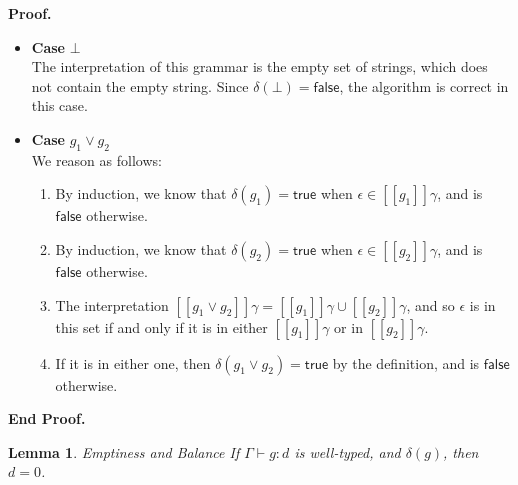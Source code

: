 \documentclass{article}
\newcommand{\judgebalance}[3][\Gamma]{{#1} \vdash {#2} : {#3}}
\newcommand{\true}{\mathsf{true}}
\newcommand{\false}{\mathsf{false}}
\newcommand{\interp}[1]{[\![{#1}]\!]}
\newcommand{\emptify}[1]{\delta({#1})}
\newtheorem{lemma}{Lemma}
\newenvironment{proof}{\noindent\textbf{Proof.}}{\noindent\textbf{End Proof.}}
\newenvironment{caseblock}{\begin{itemize}}{\end{itemize}}
\newenvironment{case}[1]{\item \textbf{Case} {#1}\\}{}
\begin{document}
\begin{proof}
\begin{caseblock}
  \begin{case}{$\bot$}
    The interpretation of this grammar is the empty set of strings, which does not
    contain the empty string. Since $\emptify{\bot} = \false$, the algorithm is correct in
    this case. 
  \end{case}

  \begin{case}{$g_1 \vee g_2$}
    We reason as follows:
    \begin{enumerate}
      \item By induction, we know that $\emptify{g_1} = \true$ when $\epsilon \in \interp{g_1}\gamma$, 
        and is $\false$  otherwise. 
      \item By induction, we know that $\emptify{g_2} = \true$ when $\epsilon \in \interp{g_2}\gamma$, 
        and is $\false$  otherwise. 
      \item The interpretation $\interp{g_1 \vee g_2}\gamma = \interp{g_1}\gamma \cup \interp{g_2}\gamma$,  
        and so $\epsilon$ is in this set if and only if it is in either $\interp{g_1}\gamma$ or in 
        $\interp{g_2}\gamma$.
      \item If it is in either one, then $\emptify{g_1 \vee g_2} = \true$ by the definition, and is 
        $\false$ otherwise. 
    \end{enumerate}
  \end{case}
\end{caseblock}
\end{proof}

\begin{lemma}{Emptiness and Balance}
If $\judgebalance{g}{d}$ is well-typed, and $\emptify{g}$, then $d = 0$. 
\end{lemma}
\end{document}
